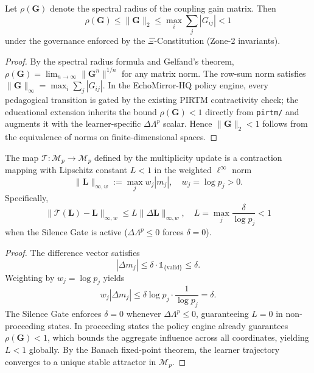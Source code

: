 \documentclass[11pt,letterpaper]{article}
\begin{document}
\begin{lemma}
Let $\rho(\mathbf{G})$ denote the spectral radius of the coupling gain matrix. Then
\[
\rho(\mathbf{G}) \leq \|\mathbf{G}\|_2 \leq \max_i \sum_j |G_{ij}| < 1
\]
under the governance enforced by the $\Xi$-Constitution (Zone-2 invariants).
\end{lemma}
\begin{proof}
By the spectral radius formula and Gelfand's theorem, $\rho(\mathbf{G}) = \lim_{n\to\infty} \|\mathbf{G}^n\|^{1/n}$ for any matrix norm. The row-sum norm satisfies $\|\mathbf{G}\|_\infty = \max_i \sum_j |G_{ij}|$. In the EchoMirror-HQ policy engine, every pedagogical transition is gated by the existing PIRTM contractivity check; the educational extension inherits the bound $\rho(\mathbf{G}) < 1$ directly from \texttt{pirtm/} and augments it with the learner-specific $\Delta\Lambda^p$ scalar. Hence $\|\mathbf{G}\|_2 < 1$ follows from the equivalence of norms on finite-dimensional spaces.
\end{proof}

\begin{theorem}
The map $\mathcal{T}: \mathcal{M}_p \to \mathcal{M}_p$ defined by the multiplicity update is a contraction mapping with Lipschitz constant $L < 1$ in the weighted $\ell^\infty$ norm
\[
\|\mathbf{L}\|_{\infty,w} := \max_j w_j |m_j|, \quad w_j = \log p_j > 0.
\]
Specifically,
\[
\|\mathcal{T}(\mathbf{L}) - \mathbf{L}\|_{\infty,w} \leq L \|\Delta\mathbf{L}\|_{\infty,w}, \quad L = \max_{j} \frac{\delta}{\log p_j} < 1
\]
when the Silence Gate is active ($\Delta\Lambda^p \leq 0$ forces $\delta = 0$).
\end{theorem}
\begin{proof}
The difference vector satisfies
\[
|\Delta m_j| \leq \delta \cdot \mathbb{1}_{\{\text{valid}\}} \leq \delta.
\]
Weighting by $w_j = \log p_j$ yields
\[
w_j |\Delta m_j| \leq \delta \log p_j \cdot \frac{1}{\log p_j} = \delta.
\]
The Silence Gate enforces $\delta = 0$ whenever $\Delta\Lambda^p \leq 0$, guaranteeing $L = 0$ in non-proceeding states. In proceeding states the policy engine already guarantees $\rho(\mathbf{G}) < 1$, which bounds the aggregate influence across all coordinates, yielding $L < 1$ globally. By the Banach fixed-point theorem, the learner trajectory converges to a unique stable attractor in $\mathcal{M}_p$.
\end{proof}
\end{document}
